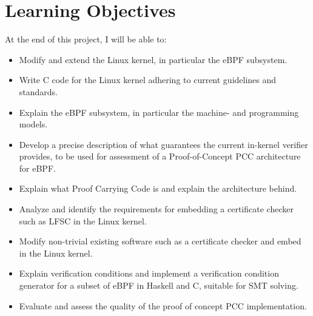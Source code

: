 \documentclass[12pt, a4paper, titlepage, oneside]{article}
\begin{document}
\section*{Learning Objectives}
At the end of this project, I will be able to:
\begin{itemize}
\item Modify and extend the Linux kernel, in particular the eBPF subsystem.
\item Write C code for the Linux kernel adhering to current guidelines and standards.
\item Explain the eBPF subsystem, in particular the machine- and programming models.
\item %
Develop a precise description of what guarantees the current in-kernel verifier provides, to be used for assessment of a Proof-of-Concept PCC architecture for eBPF.   
\item Explain what Proof Carrying Code is and explain the architecture behind.
\item Analyze and identify the requirements for embedding a certificate checker such as LFSC in the Linux kernel.
  \item Modify non-trivial existing software such as a certificate checker and embed in the Linux kernel.
\item Explain verification conditions and implement a verification condition generator for a subset of eBPF in Haskell and C, suitable for SMT solving.
\item Evaluate and assess the quality of the proof of concept PCC implementation.
\end{itemize}




\end{document}
